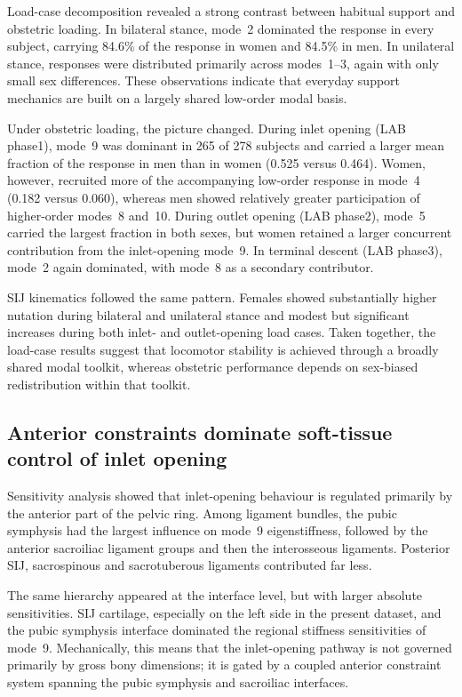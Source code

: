 \documentclass[11pt,a4paper]{article}
\begin{document}
Load-case decomposition revealed a strong contrast between habitual support and obstetric loading. In bilateral stance, mode~2 dominated the response in every subject, carrying 84.6\% of the response in women and 84.5\% in men. In unilateral stance, responses were distributed primarily across modes~1--3, again with only small sex differences. These observations indicate that everyday support mechanics are built on a largely shared low-order modal basis.

Under obstetric loading, the picture changed. During inlet opening (LAB phase1), mode~9 was dominant in 265 of 278 subjects and carried a larger mean fraction of the response in men than in women (0.525 versus 0.464). Women, however, recruited more of the accompanying low-order response in mode~4 (0.182 versus 0.060), whereas men showed relatively greater participation of higher-order modes~8 and~10. During outlet opening (LAB phase2), mode~5 carried the largest fraction in both sexes, but women retained a larger concurrent contribution from the inlet-opening mode~9. In terminal descent (LAB phase3), mode~2 again dominated, with mode~8 as a secondary contributor.

SIJ kinematics followed the same pattern. Females showed substantially higher nutation during bilateral and unilateral stance and modest but significant increases during both inlet- and outlet-opening load cases. Taken together, the load-case results suggest that locomotor stability is achieved through a broadly shared modal toolkit, whereas obstetric performance depends on sex-biased redistribution within that toolkit.

\subsection{Anterior constraints dominate soft-tissue control of inlet opening}

Sensitivity analysis showed that inlet-opening behaviour is regulated primarily by the anterior part of the pelvic ring. Among ligament bundles, the pubic symphysis had the largest influence on mode~9 eigenstiffness, followed by the anterior sacroiliac ligament groups and then the interosseous ligaments. Posterior SIJ, sacrospinous and sacrotuberous ligaments contributed far less.

The same hierarchy appeared at the interface level, but with larger absolute sensitivities. SIJ cartilage, especially on the left side in the present dataset, and the pubic symphysis interface dominated the regional stiffness sensitivities of mode~9. Mechanically, this means that the inlet-opening pathway is not governed primarily by gross bony dimensions; it is gated by a coupled anterior constraint system spanning the pubic symphysis and sacroiliac interfaces.
\end{document}
